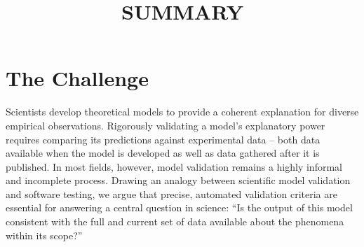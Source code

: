 \documentclass[11pt,letterpaper]{article}
\begin{document}
\title{SUMMARY}

\section{The Challenge}
Scientists develop theoretical models to provide a coherent explanation for diverse empirical observations. 
Rigorously validating a model’s explanatory power requires comparing its predictions against experimental data -- both data available when the model is developed as well as data gathered after it is published. 
In most fields, however, model validation remains a highly informal and incomplete process. 
Drawing an analogy between scientific model validation and software testing, we argue that precise, automated validation criteria are essential for answering a central question in science: 
“Is the output of this model consistent with the full and current set of data available about the phenomena within its scope?” 
\end{document}
